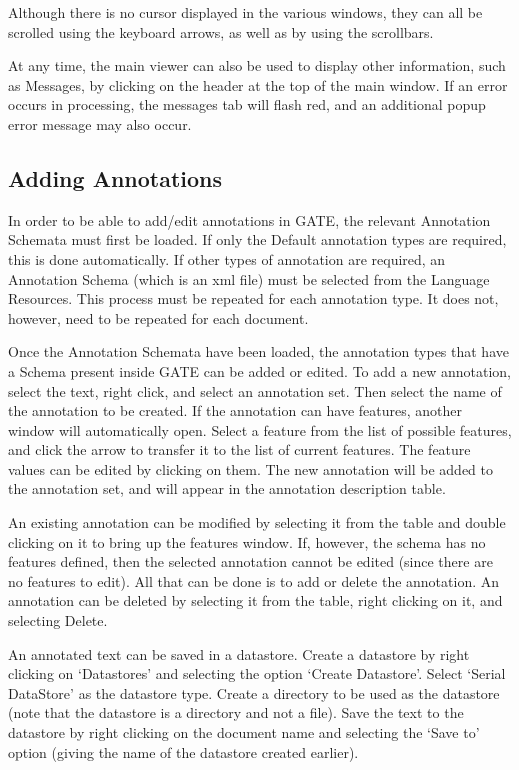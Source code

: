 Although there is no cursor displayed in the various windows, they 
can all be scrolled using the keyboard arrows, as well as by using the
scrollbars.

At any time, the main viewer can also be used to display other
information, such as Messages, by clicking on the header
at the top of the main window. If an error occurs in processing, the
messages tab will flash red, and an additional popup error message
may also occur.


\subsection{Adding Annotations}

In order to be able to add/edit annotations in GATE, the relevant
Annotation Schemata must first be loaded. If only the Default
annotation types are required, this is done automatically. If other
types of annotation are required, an Annotation Schema (which is an
xml file) must be selected from the Language Resources. This process
must be repeated for each annotation type. It does not, however, need
to be repeated for each document.

Once the Annotation Schemata have been loaded, the annotation types that
have a Schema present inside GATE can be added or edited. 
To add a new annotation, select the text, right click, and select an
annotation set. Then select the name of the
annotation to be created. If the annotation can have features, another
window will automatically open. Select a feature from the list of
possible features, and click the arrow to transfer it to the list of
current features. The feature values can be edited by clicking on
them. The new annotation will be added to the annotation set, and will
appear in the annotation description table.

An existing annotation can be modified by selecting it from the table
and double clicking on it to bring up the features
window. If, however, the schema has no features defined,
then the selected annotation cannot be edited (since there are no
features to edit). All that can be done is to add or delete the
annotation. An annotation can be deleted by selecting it from the
table, right clicking on it, and selecting Delete.

An annotated text can be saved in a datastore. Create a datastore  %
by right clicking on `Datastores' and selecting the option
`Create Datastore'. Select
`Serial DataStore' as the datastore type. Create a directory to be
used as the datastore (note that the datastore is a directory and
not a file). Save the text to the datastore by right clicking on the
document name and selecting the `Save to' option (giving the name of
the datastore created earlier).

